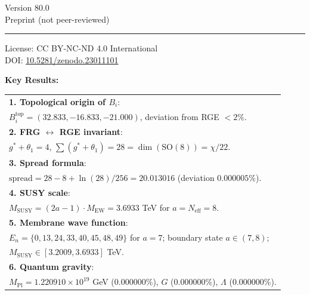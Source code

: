 \documentclass[11pt,a4paper]{article}
\newcommand{\SO}{\ensuremath{\mathrm{SO}}}
\theoremstyle{definition}
\begin{document}
\begin{titlepage}
\vspace{1.5cm}

{\large
Version 80.0 \\[0.3em]
Preprint (not peer-reviewed)
\par}

\vspace{1.5cm}
\rule{0.5\textwidth}{0.4pt}
\vspace{0.5cm}

{\small
License: CC BY-NC-ND 4.0 International \\[0.2em]
DOI: \href{https://doi.org/10.5281/zenodo.23011101}{10.5281/zenodo.23011101}
\par}

\vfill

{\small\bfseries Key Results: \par}
\vspace{0.3cm}
{\small
\begin{tabular}{p{}}
\toprule
\textbf{1. Topological origin of $B_i$}: \\
\hspace{1em}$B_i^{\text{top}} = (32.833, -16.833, -21.000)$, deviation from RGE $< 2\%$. \\[0.4em]

\textbf{2. FRG $\leftrightarrow$ RGE invariant}: \\
\hspace{1em}$g^* + \theta_1 = 4$, $\sum(g^*+\theta_1) = 28 = \dim(\SO(8)) = \chi/22$. \\[0.4em]

\textbf{3. Spread formula}: \\
\hspace{1em}$\text{spread} = 28 - 8 + \ln(28)/256 = 20.013016$ (deviation $0.000005\%$). \\[0.4em]

\textbf{4. SUSY scale}: \\
\hspace{1em}$M_{\text{SUSY}} = (2a-1) \cdot M_{\text{EW}} = 3.6933$ TeV for $a = N_{\text{eff}} = 8$. \\[0.4em]

\textbf{5. Membrane wave function}: \\
\hspace{1em}$E_n = \{0, 13, 24, 33, 40, 45, 48, 49\}$ for $a = 7$; boundary state $a \in (7,8)$; \\
\hspace{1em}$M_{\text{SUSY}} \in [3.2009, 3.6933]$ TeV. \\[0.4em]

\textbf{6. Quantum gravity}: \\
\hspace{1em}$M_{\text{Pl}} = 1.220910 \times 10^{19}$ GeV ($0.000000\%$), $G$ ($0.000000\%$), $\Lambda$ ($0.000000\%$). \\[0.4em]
\bottomrule
\end{tabular}
\par}

\vfill
\thispagestyle{empty}
\end{titlepage}
\end{document}
